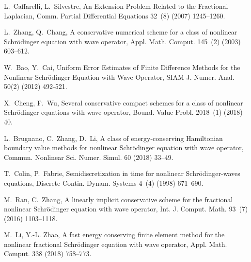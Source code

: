 \documentclass[preprint,compress,3p,10pt,fleqn]{elsarticle}
\numberwithin{equation}{section}
\begin{document}
		
	

\begin{thebibliography}{10}
	
	L.~Caffarelli, L.~Silvestre, An
	  Extension Problem Related to the Fractional Laplacian, Comm. Partial
	  Differential Equations 32~(8) (2007) 1245--1260.

	L.~Zhang, Q.~Chang, A conservative numerical scheme for a class of nonlinear Schr\"odinger
	  equation with wave operator, Appl. Math. Comput. 145~(2) (2003) 603--612.

	 W.~Bao, Y.~Cai, Uniform
	  Error Estimates of Finite Difference Methods for the Nonlinear
	  Schr\"odinger Equation with Wave Operator, SIAM J. Numer. Anal. 50(2) (2012) 492-521.

	X.~Cheng, F.~Wu, Several conservative compact schemes for a class of nonlinear Schr\"odinger
	  equations with wave operator, Bound. Value Probl. 2018~(1) (2018) 40.
	
	L.~Brugnano, C.~Zhang, D.~Li, A class of energy-conserving Hamiltonian boundary value methods for nonlinear
	  Schr\"odinger equation with wave operator, Commun. Nonlinear Sci. Numer. Simul. 60 (2018) 33--49.

	T.~Colin, P.~Fabrie, Semidiscretization in time for nonlinear Schr\"odinger-waves equations, Discrete Contin.
	  Dynam. Systems 4~(4) (1998) 671--690.
	
	M.~Ran, C.~Zhang, A linearly implicit conservative scheme for the fractional nonlinear
	  Schr\"odinger equation with wave operator, Int. J. Comput. Math. 93~(7)(2016) 1103--1118.

	M.~Li, Y.-L. Zhao, A fast energy conserving finite element method for the nonlinear fractional
	  Schr\"odinger equation with wave operator, Appl. Math. Comput. 338 (2018) 758--773.


\end{thebibliography}
\end{document}
